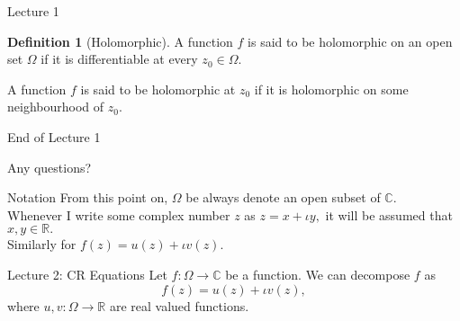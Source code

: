 \documentclass[dvipsnames]{beamer}
\theoremstyle{definition}
\newtheorem{defn}{Definition}
\newtheorem{rem}{Remark}
\begin{document}
\begin{frame}{Lecture 1}
    \begin{defn}[Holomorphic]
        A function $f$ is said to be holomorphic on an open set $\Omega$ if it is differentiable at every $z_0 \in \Omega.$

        A function $f$ is said to be holomorphic at $z_0$ if it is holomorphic on some neighbourhood of $z_0.$
    \end{defn}
\end{frame}
\begin{frame}{End of Lecture 1}
    \begin{tcolorbox}
        Any questions?
    \end{tcolorbox}
\end{frame}
\begin{frame}{Notation}
    From this point on, $\Omega$ be always denote an open subset of $\mathbb{C}.$\\
    Whenever I write some complex number $z$ as $z = x + \iota y,$ it will be assumed that $x, y \in \mathbb{R}.$\\
    Similarly for $f(z) = u(z) + \iota v(z).$
\end{frame}
\begin{frame}{Lecture 2: CR Equations}
    Let $f:\Omega \to \mathbb{C}$ be a function. We can decompose $f$ as
    \begin{equation*} 
        f(z) = u(z) + \iota v(z),
    \end{equation*}
    where $u, v : \Omega \to \mathbb{R}$ are real valued functions.

\end{frame}
    
\end{document}
